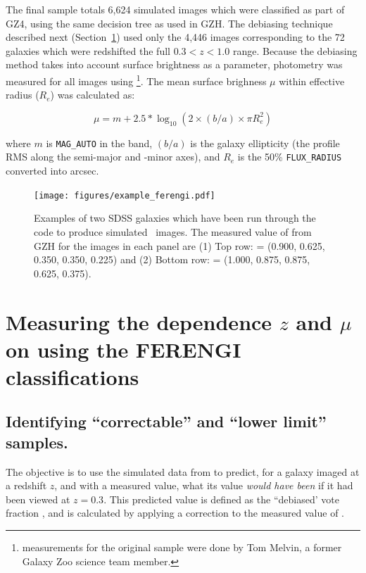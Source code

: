 The final \ferengi{} sample totals 6,624 simulated images which were classified as part of GZ4, using the same decision tree as used in GZH. The debiasing technique described next (Section~\ref{sec:ferengidebiasing}) used only the 4,446 images corresponding to the 72 galaxies which were redshifted the full $0.3<z<1.0$ range. Because the debiasing method takes into account surface brightness as a parameter, photometry was measured for all images using \sextractor{} \footnote{\sextractor{} measurements for the original \ferengi{} sample were done by Tom Melvin, a former Galaxy Zoo science team member.}. The mean surface brighness $\mu$ within effective radius ($R_{e}$) was calculated as:

\begin{equation}
\label{eqn:mu}
\mu = m + 2.5*\log_{10}{(2 \times (b/a) \times \pi R_e^2 )}
\end{equation}

where $m$ is {\tt MAG\_AUTO} in the \Iband{} band, $(b/a)$ is the galaxy
ellipticity (the profile RMS along the semi-major and -minor axes), and $R_e$
is the 50\% {\tt FLUX\_RADIUS} converted into arcsec.


 

\begin{figure}
\centering
\texttt{[image: figures/example\_ferengi.pdf]}
\caption{Examples of two SDSS galaxies which have been run through the \ferengi{} code to produce simulated \hst~images. The measured value of \ffeatures{} from GZH for the images in each panel are (1) Top row: \ffeatures{} = (0.900, 0.625, 0.350, 0.350, 0.225) and (2) Bottom row: \ffeatures{} = (1.000, 0.875, 0.875, 0.625, 0.375).}
\label{fig:ferengi1_examples}
\end{figure}



\section{Measuring the dependence $z$ and $\mu$ on \ffeatures{} using the FERENGI classifications }
\label{sec:ferengidebiasing}
\subsection{Identifying ``correctable'' and ``lower limit'' samples.}
\label{ssec:correctablesamples}

The objective is to use the simulated data from \ferengi{} to predict, for a galaxy imaged at a redshift $z$, and with a measured \ffeaturesz{} value, what its \ffeatures{} value \emph{would have been} if it had been viewed at $z=0.3$. This predicted value is defined as the ``debiased' vote fraction \ffeaturesdebiased, and is calculated by applying a correction to the measured value of \ffeatures.

